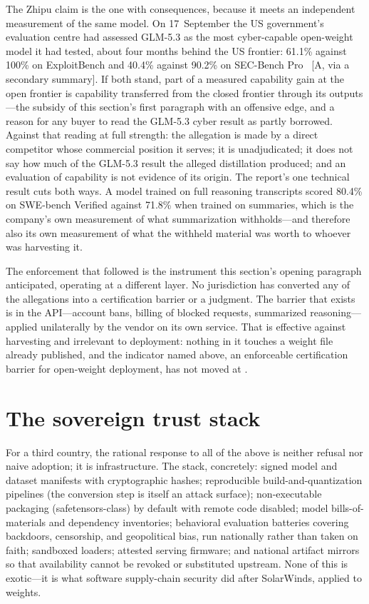 The Zhipu claim is the one with consequences, because it meets an independent measurement of the same model. On 17~September the US government's evaluation centre had assessed GLM-5.3 as the most cyber-capable open-weight model it had tested, about four months behind the US frontier: 61.1\% against 100\% on ExploitBench and 40.4\% against 90.2\% on SEC-Bench Pro~\cite{mdl-caissi-glm53} [A, via a secondary summary]. If both stand, part of a measured capability gain at the open frontier is capability transferred from the closed frontier through its outputs---the subsidy of this section's first paragraph with an offensive edge, and a reason for any buyer to read the GLM-5.3 cyber result as partly borrowed. Against that reading at full strength: the allegation is made by a direct competitor whose commercial position it serves; it is unadjudicated; it does not say how much of the GLM-5.3 result the alleged distillation produced; and an evaluation of capability is not evidence of its origin. The report's one technical result cuts both ways. A model trained on full reasoning transcripts scored 80.4\% on SWE-bench Verified against 71.8\% when trained on summaries, which is the company's own measurement of what summarization withholds---and therefore also its own measurement of what the withheld material was worth to whoever was harvesting it.

The enforcement that followed is the instrument this section's opening paragraph anticipated, operating at a different layer. No jurisdiction has converted any of the allegations into a certification barrier or a judgment. The barrier that exists is in the API---account bans, billing of blocked requests, summarized reasoning---applied unilaterally by the vendor on its own service. That is effective against harvesting and irrelevant to deployment: nothing in it touches a weight file already published, and the indicator named above, an enforceable certification barrier for open-weight deployment, has not moved at \datafreeze.

\section{The sovereign trust stack}

For a third country, the rational response to all of the above is neither refusal nor naive adoption; it is infrastructure. The stack, concretely: signed model and dataset manifests with cryptographic hashes; reproducible build-and-quantization pipelines (the conversion step is itself an attack surface); non-executable packaging (safetensors-class) by default with remote code disabled; model bills-of-materials and dependency inventories; behavioral evaluation batteries covering backdoors, censorship, and geopolitical bias, run nationally rather than taken on faith; sandboxed loaders; attested serving firmware; and national artifact mirrors so that availability cannot be revoked or substituted upstream. None of this is exotic---it is what software supply-chain security did after SolarWinds, applied to weights.

